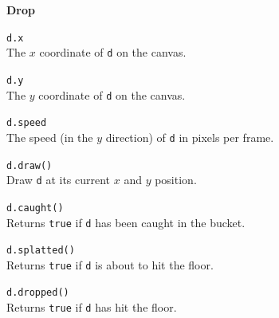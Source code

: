 \documentclass[10pt,twocolumn]{article}
\begin{document}
\thispagestyle{empty}


\noindent\textbf{\large Drop}
\begin{description}
\item{\texttt{d.x}}\ \\[.25em]
%
  The $x$ coordinate of \texttt{d} on the canvas. 

\item{\texttt{d.y}}\ \\[.25em]
%
  The $y$ coordinate of \texttt{d} on the canvas. 

\item{\texttt{d.speed}}\ \\[.25em]
%
  The speed (in the $y$ direction) of \texttt{d} in pixels per frame. 

\item{\texttt{d.draw()}}\ \\[.25em]
%
  Draw \texttt{d} at its current $x$ and $y$ position.

\item{\texttt{d.caught()}}\ \\[.25em]
%
  Returns \texttt{true} if \texttt{d} has been caught in the bucket.

\item{\texttt{d.splatted()}}\ \\[.25em]
%
  Returns \texttt{true} if \texttt{d} is about to hit the floor.

\item{\texttt{d.dropped()}}\ \\[.25em]
%
  Returns \texttt{true} if \texttt{d} has hit the floor.

\end{description}

\bigskip
\end{document}
